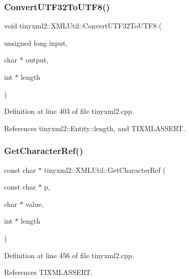 \subsubsection{Convert\+U\+T\+F32\+To\+U\+T\+F8()}
{\footnotesize\ttfamily void tinyxml2\+::\+X\+M\+L\+Util\+::\+Convert\+U\+T\+F32\+To\+U\+T\+F8 (\begin{DoxyParamCaption}\item[{unsigned long}]{input,  }\item[{char $\ast$}]{output,  }\item[{int $\ast$}]{length }\end{DoxyParamCaption})\hspace{0.3cm}{\ttfamily [static]}}



Definition at line 403 of file tinyxml2.\+cpp.



References tinyxml2\+::\+Entity\+::length, and T\+I\+X\+M\+L\+A\+S\+S\+E\+RT.

\mbox{\label{classtinyxml2_1_1_x_m_l_util_a5a96e5144a8d693dc4bcd783d9964648}} 
\subsubsection{Get\+Character\+Ref()}
{\footnotesize\ttfamily const char $\ast$ tinyxml2\+::\+X\+M\+L\+Util\+::\+Get\+Character\+Ref (\begin{DoxyParamCaption}\item[{const char $\ast$}]{p,  }\item[{char $\ast$}]{value,  }\item[{int $\ast$}]{length }\end{DoxyParamCaption})\hspace{0.3cm}{\ttfamily [static]}}



Definition at line 456 of file tinyxml2.\+cpp.



References T\+I\+X\+M\+L\+A\+S\+S\+E\+RT.

\mbox{\label{classtinyxml2_1_1_x_m_l_util_a04b17341538fa11752f24b4301d19485}} 
